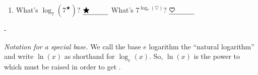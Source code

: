 \documentclass{article}
\makeatletter
\newlength{\tipmargin}
\renewenvironment{framed}{
  \setlength{\tipmargin}{\textwidth-\linewidth}
  \advance\@totalleftmargin-\tipmargin
  \def\FrameCommand{\hspace{\tipmargin}\fbox}%
  \advance\linewidth\tipmargin
  \MakeFramed {\advance\hsize-\width \FrameRestore}%
}
{\endMakeFramed}
\makeatother
\begin{document}
\begin{enumerate}
\begin{enumerate}
    \begin{solution}
      The graph of of $y=\log_7 x$ is the graph of $y=7^x$
      reflected over the line $y=x$. We found several
      points on the graph in part (b),
      e.g. $(\frac{1}{7},0)$, $(1, 0)$, and $(7, 0)$. 

      \begin{center}
      \end{center}
      The domain of the function is $(0, \infty)$ and the range
      is $(-\infty, \infty)$. The $x$-intercept is $(1,0)$, and
      there are no $y$-intercepts. There is a vertical asymptote,
      $x=0$.
    \end{solution}

  \item


    \begin{problem}[0.5in]
      What's $\log_7 \left( 7^\bigstar \right)$? 
      $\fitb{0.5in}{\bigstar}$ \tab What's
      $7^{\log_7 (\heartsuit)}$? $\fitb{0.5in}{\heartsuit}$
    \end{problem}

  \end{enumerate}

\end{enumerate}
\begin{framed}
  \emph{Notation for a special base.}  We call the base $e$ logarithm
  the ``natural logarithm'' and write $\ln(x)$ as shorthand for $\log_e (x)$.
  So, $\ln (x)$ is the power to which  must be raised
  in order to get .
\end{framed}
\end{document}
